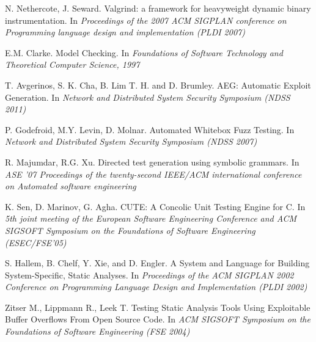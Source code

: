 \documentclass[12pt,a4paper]{article}
\begin{document}
\begin{thebibliography}{9}
        N. Nethercote, J. Seward.
        Valgrind: a framework for heavyweight dynamic binary instrumentation.
        In\emph{ Proceedings of the 2007 ACM SIGPLAN conference on Programming language design and implementation (PLDI 2007)}
        
        E.M. Clarke.
        Model Checking.
        In\emph{ Foundations of Software Technology and Theoretical Computer Science, 1997}
        
        T. Avgerinos, S. K. Cha, B. Lim T. H. and D. Brumley.
        AEG: Automatic Exploit Generation.
        In\emph{ Network and Distributed System Security Symposium (NDSS 2011)}

        P. Godefroid, M.Y. Levin, D. Molnar.
        Automated Whitebox Fuzz Testing.
        In\emph{ Network and Distributed System Security Symposium (NDSS 2007)}
        
        R. Majumdar, R.G. Xu.
        Directed test generation using symbolic grammars.        
        In \emph{ASE '07 Proceedings of the twenty-second IEEE/ACM international conference on Automated software engineering}
       
        K. Sen, D. Marinov, G. Agha. 
        CUTE: A Concolic Unit Testing Engine for C. 
        In\emph{ 5th joint meeting of the European Software Engineering Conference and ACM SIGSOFT Symposium on the Foundations of Software Engineering (ESEC/FSE'05)}

        S. Hallem, B. Chelf, Y. Xie, and D. Engler.
        A System and Language for Building System-Specific, Static Analyses.
        In\emph{ Proceedings of the ACM SIGPLAN 2002 Conference on Programming Language Design and Implementation (PLDI 2002)}

        Zitser M., Lippmann R., Leek T. 
        Testing Static Analysis Tools Using Exploitable Buffer Overflows From Open Source Code.
        In \emph{ACM SIGSOFT Symposium on the Foundations of Software Engineering (FSE 2004)}

\end{thebibliography}
\end{document}
